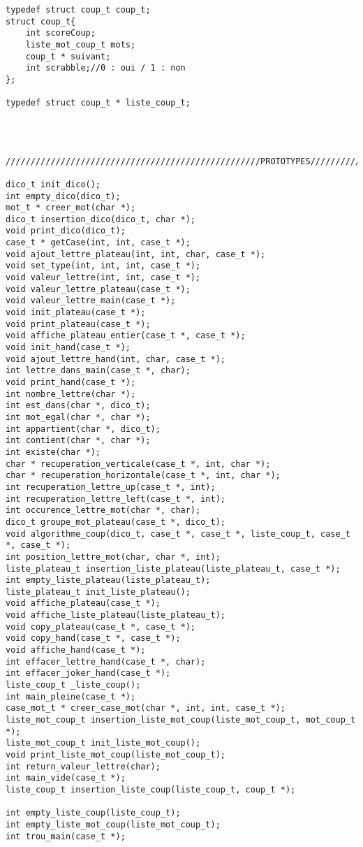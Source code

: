 \documentclass[a4paper]{article}
\begin{document}
\begin{verbatim}
typedef struct coup_t coup_t;
struct coup_t{
	int scoreCoup;
	liste_mot_coup_t mots;
	coup_t * suivant;
	int scrabble;//0 : oui / 1 : non
};

typedef struct coup_t * liste_coup_t;




///////////////////////////////////////////////////PROTOTYPES/////////////////////////////////////////////////////////////

dico_t init_dico();
int empty_dico(dico_t);
mot_t * creer_mot(char *);
dico_t insertion_dico(dico_t, char *);
void print_dico(dico_t);
case_t * getCase(int, int, case_t *);
void ajout_lettre_plateau(int, int, char, case_t *);
void set_type(int, int, int, case_t *);
void valeur_lettre(int, int, case_t *);
void valeur_lettre_plateau(case_t *);
void valeur_lettre_main(case_t *);
void init_plateau(case_t *);
void print_plateau(case_t *);
void affiche_plateau_entier(case_t *, case_t *);
void init_hand(case_t *);
void ajout_lettre_hand(int, char, case_t *);
int lettre_dans_main(case_t *, char);
void print_hand(case_t *);
int nombre_lettre(char *);
int est_dans(char *, dico_t);
int mot_egal(char *, char *);
int appartient(char *, dico_t);
int contient(char *, char *);
int existe(char *);
char * recuperation_verticale(case_t *, int, char *);
char * recuperation_horizontale(case_t *, int, char *);
int recuperation_lettre_up(case_t *, int);
int recuperation_lettre_left(case_t *, int);
int occurence_lettre_mot(char *, char);
dico_t groupe_mot_plateau(case_t *, dico_t);
void algorithme_coup(dico_t, case_t *, case_t *, liste_coup_t, case_t *, case_t *);
int position_lettre_mot(char, char *, int);
liste_plateau_t insertion_liste_plateau(liste_plateau_t, case_t *);
int empty_liste_plateau(liste_plateau_t);
liste_plateau_t init_liste_plateau();
void affiche_plateau(case_t *);
void affiche_liste_plateau(liste_plateau_t);
void copy_plateau(case_t *, case_t *);
void copy_hand(case_t *, case_t *);
void affiche_hand(case_t *);
int effacer_lettre_hand(case_t *, char);
int effacer_joker_hand(case_t *);
liste_coup_t _liste_coup();
int main_pleine(case_t *);
case_mot_t * creer_case_mot(char *, int, int, case_t *);
liste_mot_coup_t insertion_liste_mot_coup(liste_mot_coup_t, mot_coup_t *);
liste_mot_coup_t init_liste_mot_coup();
void print_liste_mot_coup(liste_mot_coup_t);
int return_valeur_lettre(char);
int main_vide(case_t *);
liste_coup_t insertion_liste_coup(liste_coup_t, coup_t *);

int empty_liste_coup(liste_coup_t);
int empty_liste_mot_coup(liste_mot_coup_t);
int trou_main(case_t *);

\end{verbatim}
\end{document}
